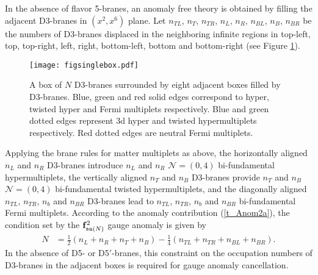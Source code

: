 \documentclass{article}
\numberwithin{equation}{section}
\begin{document}
In the absence of flavor 5-branes, 
an anomaly free theory is obtained by filling the adjacent D3-branes in $(x^{2}, x^{6})$ plane.  
Let $n_{TL}$, $n_{T}$, $n_{TR}$, $n_{L}$, $n_{R}$, 
$n_{BL}$, $n_{B}$, $n_{BR}$ be the numbers of D3-branes displaced in the neighboring infinite regions 
in top-left, top, top-right, 
left, right, bottom-left, bottom and bottom-right (see Figure \ref{figsinglebox}). 
\begin{figure}
\begin{center}
\texttt{[image: figsinglebox.pdf]}
\caption{A box of $N$ D3-branes surrounded by eight adjacent boxes filled by D3-branes.  
Blue, green and red solid edges correspond to hyper, twisted hyper and Fermi multiplets respectively. 
Blue and green dotted edges represent 3d hyper and twisted hypermultiplets respectively. 
Red dotted edges are neutral Fermi multiplets. }
\label{figsinglebox}
\end{center}
\end{figure}
Applying the brane rules for matter multiplets as above,
the horizontally aligned $n_{L}$ and $n_{R}$ D3-branes introduce $n_{L}$ and $n_{R}$ 
$\mathcal{N}=(0,4)$ bi-fundamental hypermultiplets, 
the vertically aligned $n_{T}$ and $n_{B}$ D3-branes provide 
$n_{T}$ and $n_{B}$ $\mathcal{N}=(0,4)$ bi-fundamental twisted hypermultiplets, 
and the diagonally aligned $n_{TL}$, $n_{TR}$, $n_{b}$ and $n_{BR}$ D3-branes 
lead to $n_{TL}$, $n_{TR}$, $n_{b}$ and $n_{BR}$ bi-fundamental Fermi multiplets. 
According to the anomaly contribution (\ref{t_Anom2a}), the
condition set by the ${\bf f}^{2}_{\mathfrak{su}(N)}$ gauge anomaly is given by 
\begin{align}
\label{brane_anomaly}
N&=\frac12 (n_{L}+n_{R}+n_{T}+n_{B})
-\frac{1}{4} (n_{TL}+n_{TR}+n_{BL}+n_{BR}). 
\end{align}
In the absence of D5- or D5$'$-branes, 
this constraint on the occupation numbers of D3-branes in the adjacent boxes 
is required for gauge anomaly cancellation.  
 
\end{document}
